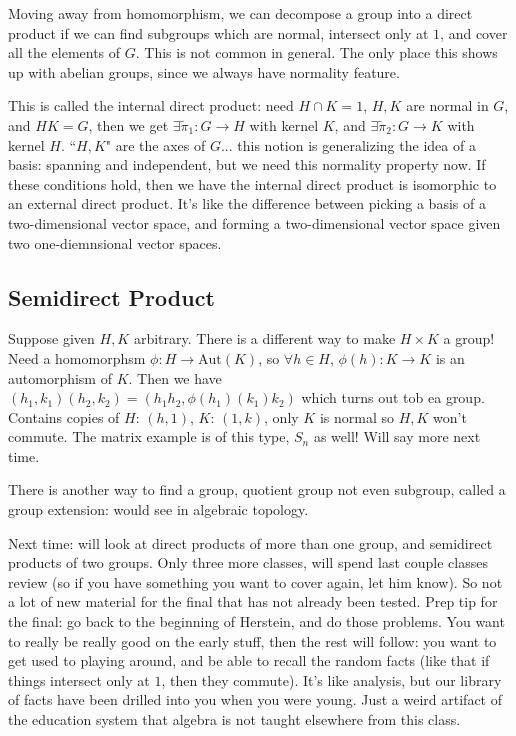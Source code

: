 \documentclass{article}
\theoremstyle{plain}
\theoremstyle{remark}
\begin{document}
Moving away from homomorphism, we can decompose a group into a direct product
if we can find subgroups which are normal, intersect only at $1$,
and cover all the elements of $G$.
This is not common in general.
The only place this shows up with abelian groups,
since we always have normality feature.

This is called the internal direct product:
need $H \cap K = 1$, $H,K$ are normal in $G$, and $HK = G$,
then we get $\exists \tilde{\pi}_1 \colon G \to H$ with kernel $K$,
and $\exists \tilde{\pi}_2 \colon G \to K$ with kernel $H$.
``$H,K$" are the axes of $G$...
this notion is generalizing the idea of a basis: spanning and independent,
but we need this normality property now.
If these conditions hold, then we have the internal direct product
is isomorphic to an external direct product.
It's like the difference between picking a basis of a two-dimensional vector space,
and forming a two-dimensional vector space given two one-diemnsional vector spaces.

\subsection{Semidirect Product}
Suppose given $H,K$ arbitrary.
There is a different way to make $H \times K$ a group!
Need a homomorphsm $\phi \colon H \to \mathrm{Aut}(K)$,
so $\forall h \in H$, $\phi(h)\colon K \to K$ is an automorphism of $K$.
Then we have $(h_1,k_1)(h_2,k_2) = (h_1h_2, \phi(h_1)(k_1)k_2)$
which turns out tob ea group.
Contains copies of $H$: $(h,1)$, $K$: $(1,k)$,
only $K$ is normal so $H,K$ won't commute.
The matrix example is of this type, $S_n$ as well!
Will say more next time.

There is another way to find a group, quotient group not even subgroup,
called a group extension: would see in algebraic topology.

Next time: will look at direct products of more than one group,
and semidirect products of two groups.
Only three more classes, will spend last couple classes review
(so if you have something you want to cover again, let him know).
So not a lot of new material for the final that has not already been tested.
Prep tip for the final: go back to the beginning of Herstein,
and do those problems.
You want to really be really good on the early stuff,
then the rest will follow:
you want to get used to playing around, and be able to recall the random facts
(like that if things intersect only at $1$, then they commute).
It's like analysis, but our library of facts have been drilled into you when you were young.
Just a weird artifact of the education system that algebra is not taught elsewhere from this class.
\end{document}

